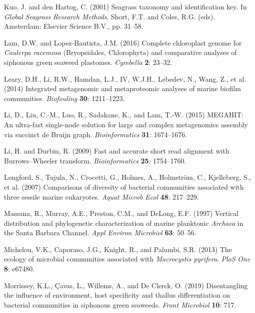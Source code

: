 \documentclass[12pt,]{article}
\begin{document}
\leavevmode\hypertarget{ref-Kuo2001}{}%
Kuo, J. and den Hartog, C. (2001) Seagrass taxonomy and identification
key. In \emph{Global Seagrass Research Methods}. Short, F.T. and Coles,
R.G. (eds). Amsterdam: Elsevier Science B.V., pp. 31--58.

\leavevmode\hypertarget{ref-Lam2016}{}%
Lam, D.W. and Lopez-Bautista, J.M. (2016) Complete chloroplast genome
for \emph{Caulerpa racemosa} (Bryopsidales, Chlorophyta) and comparative
analyses of siphonous green seaweed plastomes. \emph{Cymbella}
\textbf{2}: 23--32.

\leavevmode\hypertarget{ref-Leary2014}{}%
Leary, D.H., Li, R.W., Hamdan, L.J., IV, W.J.H., Lebedev, N., Wang, Z.,
et al. (2014) Integrated metagenomic and metaproteomic analyses of
marine biofilm communities. \emph{Biofouling} \textbf{30}: 1211--1223.

\leavevmode\hypertarget{ref-Li2015}{}%
Li, D., Liu, C.-M., Luo, R., Sadakane, K., and Lam, T.-W. (2015)
MEGAHIT: An ultra-fast single-node solution for large and complex
metagenomics assembly via succinct de Bruijn graph.
\emph{Bioinformatics} \textbf{31}: 1674--1676.

\leavevmode\hypertarget{ref-Li2009a}{}%
Li, H. and Durbin, R. (2009) Fast and accurate short read alignment with
Burrows--Wheeler transform. \emph{Bioinformatics} \textbf{25}:
1754--1760.

\leavevmode\hypertarget{ref-Longford2007}{}%
Longford, S., Tujula, N., Crocetti, G., Holmes, A., Holmström, C.,
Kjelleberg, S., et al. (2007) Comparisons of diversity of bacterial
communities associated with three sessile marine eukaryotes. \emph{Aquat
Microb Ecol} \textbf{48}: 217--229.

\leavevmode\hypertarget{ref-Massana1997}{}%
Massana, R., Murray, A.E., Preston, C.M., and DeLong, E.F. (1997)
Vertical distribution and phylogenetic characterization of marine
planktonic \emph{Archaea} in the Santa Barbara Channel. \emph{Appl
Environ Microbiol} \textbf{63}: 50--56.

\leavevmode\hypertarget{ref-Michelou2013}{}%
Michelou, V.K., Caporaso, J.G., Knight, R., and Palumbi, S.R. (2013) The
ecology of microbial communities associated with \emph{Macrocystis
pyrifera}. \emph{PloS One} \textbf{8}: e67480.

\leavevmode\hypertarget{ref-Morrissey2019}{}%
Morrissey, K.L., Çavas, L., Willems, A., and De Clerck, O. (2019)
Disentangling the influence of environment, host specificity and thallus
differentiation on bacterial communities in siphonous green seaweeds.
\emph{Front Microbiol} \textbf{10}: 717.
\end{document}
